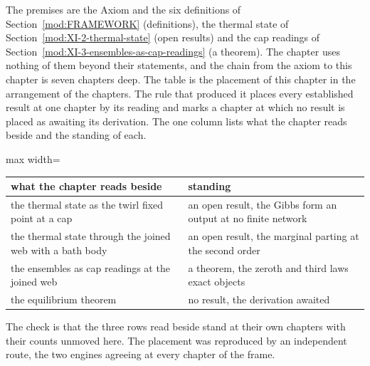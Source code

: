 \begin{chproof}[instrument]
The premises are the Axiom and the six definitions of Section~\ref{mod:FRAMEWORK} (definitions), the thermal state of Section~\ref{mod:XI-2-thermal-state} (open results) and the cap readings of Section~\ref{mod:XI-3-ensembles-as-cap-readings} (a theorem). The chapter uses nothing of them beyond their statements, and the chain from the axiom to this chapter is seven chapters deep.
The table is the placement of this chapter in the arrangement of the chapters. The rule that produced it places every established result at one chapter by its reading and marks a chapter at which no result is placed as awaiting its derivation. The one column lists what the chapter reads beside and the standing of each.
\begin{center}
\begin{adjustbox}{max width=\linewidth}\begin{tabular}{ll}
\hline
what the chapter reads beside & standing \\
\hline
the thermal state as the twirl fixed point at a cap & an open result, the Gibbs form an output at no finite network \\
the thermal state through the joined web with a bath body & an open result, the marginal parting at the second order \\
the ensembles as cap readings at the joined web & a theorem, the zeroth and third laws exact objects \\
the equilibrium theorem & no result, the derivation awaited \\
\hline
\end{tabular}\end{adjustbox}
\end{center}
The check is that the three rows read beside stand at their own chapters with their counts unmoved here.
The placement was reproduced by an independent route, the two engines agreeing at every chapter of the frame.
\end{chproof}

